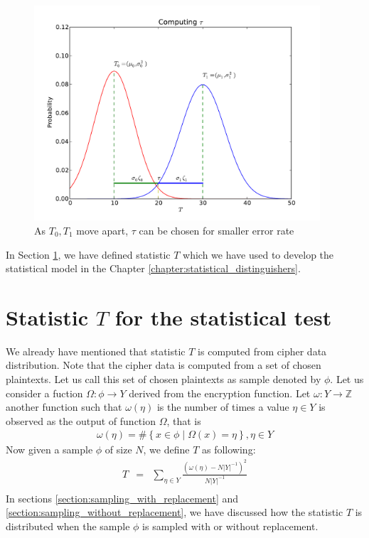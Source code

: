 \begin{figure}[h!]
    \centering
    \includegraphics[width=\textwidth , height = 8cm]{images/single_tau_as_the_distributions_distinguishes}
    \caption{As $T_0,T_1$ move apart, $\tau$ can be chosen for smaller error rate}
    \label{fig:single_tau_as_distributions_distinguishes}
\end{figure}
\par \noindent In Section \ref{section:statistic_T}, we have defined statistic $T$ which we have used to develop the statistical model in the Chapter \ref{chapter:statistical_distinguishers}.

\section{Statistic $T$ for the statistical test} \label{section:statistic_T}
We already have mentioned that statistic $T$ is computed from cipher data distribution. Note that the cipher data is computed from a set of chosen plaintexts. Let us call this set of chosen plaintexts as sample denoted by $\phi$. Let us consider a fuction $\Omega:\phi \rightarrow Y$ derived from the encryption function. Let $\omega:Y \rightarrow \mathbb{Z}$ another function such that $\omega\left(\eta \right)$ is the number of times a value $\eta \in Y$ is observed as the output of function $\Omega$, that is
\begin{eqnarray*}
\omega\left( \eta \right) = \# \left\lbrace x \in \phi \; \vert \; \Omega \left( x \right) = \eta \right\rbrace , \eta \in Y
\end{eqnarray*}
Now given a sample $\phi$ of size $N$, we define $T$ as following:
\begin{eqnarray*}
T&=&\displaystyle\sum_{\eta \in Y}\frac{\left( \omega(\eta) - N|Y|^{-1}\right)^2}{N|Y|^{-1}} \\ 
\end{eqnarray*} In sections \ref{section:sampling_with_replacement} and \ref{section:sampling_without_replacement}, we have discussed how the statistic $T$ is distributed when the sample $\phi$ is sampled with or without replacement. 

